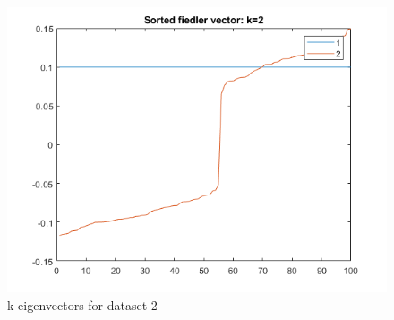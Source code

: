 \documentclass[]{article}
\begin{document}
\begin{figure}[!h]
    \centering
    \includegraphics[width=.8\textwidth]{../example2_fielderVector.png}
    \caption{k-eigenvectors for dataset 2}
    \label{fig:lpG22}
\end{figure}
\end{document}
